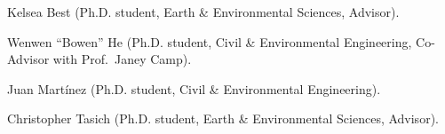 \item Kelsea Best (Ph.D. student, Earth \& Environmental Sciences, Advisor).
\item Wenwen ``Bowen'' He (Ph.D. student, Civil \& Environmental Engineering, Co-Advisor with Prof.\ Janey Camp).
\item Juan Mart\'inez (Ph.D. student, Civil \& Environmental Engineering).
\item Christopher Tasich (Ph.D. student, Earth \& Environmental Sciences, Advisor).
